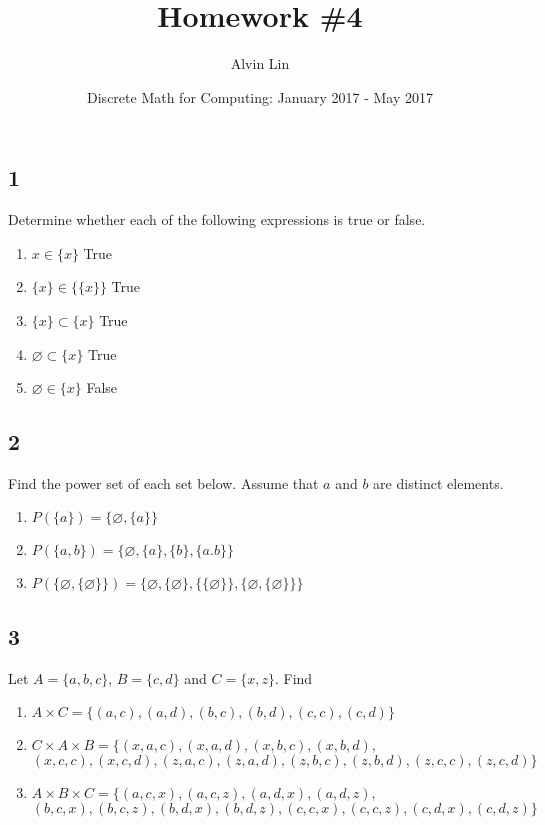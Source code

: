 \documentclass{math}
\title{Homework \#4}
\author{Alvin Lin}
\date{Discrete Math for Computing: January 2017 - May 2017}
\begin{document}
\maketitle

\subsection*{1}
Determine whether each of the following expressions is true or false.
\renewcommand{\labelenumi}{(\alph{enumi})}
\begin{enumerate}
  \item \( x \in \{x\} \) True
  \item \( \{x\} \in \{\{x\}\} \) True
  \item \( \{x\} \subset \{x\} \) True
  \item \( \varnothing \subset \{x\} \) True
  \item \( \varnothing \in \{x\} \) False
\end{enumerate}

\subsection*{2}
Find the power set of each set below. Assume that \( a \) and \( b \) are
distinct elements.
\begin{enumerate}
  \item \( P(\{a\}) = \{\varnothing,\{a\}\} \)
  \item \( P(\{a,b\}) = \{\varnothing,\{a\},\{b\},\{a.b\}\} \)
  \item \( P(\{\varnothing,\{\varnothing\}\}) = \{\varnothing,\{\varnothing\},
      \{\{\varnothing\}\},\{\varnothing,\{\varnothing\}\}\} \)
\end{enumerate}

\subsection*{3}
Let \( A = \{a,b,c\} \), \( B = \{c,d\} \) and \( C = \{x,z\} \). Find
\begin{enumerate}
  \item \( A\times C = \{(a,c),(a,d),(b,c),(b,d),(c,c),(c,d)\} \)
  \item \( C\times A\times B = \{(x,a,c),(x,a,d),(x,b,c),(x,b,d), \) \\
    \( (x,c,c),(x,c,d),(z,a,c),(z,a,d),(z,b,c),(z,b,d),(z,c,c),(z,c,d)\} \)
  \item \( A\times B\times C = \{(a,c,x),(a,c,z),(a,d,x),(a,d,z), \) \\
    \( (b,c,x),(b,c,z),(b,d,x),(b,d,z),(c,c,x),(c,c,z),(c,d,x),(c,d,z) \} \)
\end{enumerate}
\end{document}

